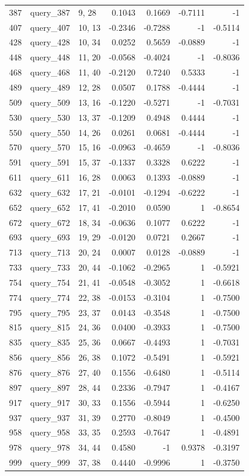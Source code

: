 {\begin{longtable}{@{}r l l r r r r@{}}
387 & query\_387 & 9, 28 & 0.1043 & 0.1669 & -0.7111 & -1 \\
407 & query\_407 & 10, 13 & -0.2346 & -0.7288 & -1 & -0.5114 \\
428 & query\_428 & 10, 34 & 0.0252 & 0.5659 & -0.0889 & -1 \\
448 & query\_448 & 11, 20 & -0.0568 & -0.4024 & -1 & -0.8036 \\
468 & query\_468 & 11, 40 & -0.2120 & 0.7240 & 0.5333 & -1 \\
489 & query\_489 & 12, 28 & 0.0507 & 0.1788 & -0.4444 & -1 \\
509 & query\_509 & 13, 16 & -0.1220 & -0.5271 & -1 & -0.7031 \\
530 & query\_530 & 13, 37 & -0.1209 & 0.4948 & 0.4444 & -1 \\
550 & query\_550 & 14, 26 & 0.0261 & 0.0681 & -0.4444 & -1 \\
570 & query\_570 & 15, 16 & -0.0963 & -0.4659 & -1 & -0.8036 \\
591 & query\_591 & 15, 37 & -0.1337 & 0.3328 & 0.6222 & -1 \\
611 & query\_611 & 16, 28 & 0.0063 & 0.1393 & -0.0889 & -1 \\
632 & query\_632 & 17, 21 & -0.0101 & -0.1294 & -0.6222 & -1 \\
652 & query\_652 & 17, 41 & -0.2010 & 0.0590 & 1 & -0.8654 \\
672 & query\_672 & 18, 34 & -0.0636 & 0.1077 & 0.6222 & -1 \\
693 & query\_693 & 19, 29 & -0.0120 & 0.0721 & 0.2667 & -1 \\
713 & query\_713 & 20, 24 & 0.0007 & 0.0128 & -0.0889 & -1 \\
733 & query\_733 & 20, 44 & -0.1062 & -0.2965 & 1 & -0.5921 \\
754 & query\_754 & 21, 41 & -0.0548 & -0.3052 & 1 & -0.6618 \\
774 & query\_774 & 22, 38 & -0.0153 & -0.3104 & 1 & -0.7500 \\
795 & query\_795 & 23, 37 & 0.0143 & -0.3548 & 1 & -0.7500 \\
815 & query\_815 & 24, 36 & 0.0400 & -0.3933 & 1 & -0.7500 \\
835 & query\_835 & 25, 36 & 0.0667 & -0.4493 & 1 & -0.7031 \\
856 & query\_856 & 26, 38 & 0.1072 & -0.5491 & 1 & -0.5921 \\
876 & query\_876 & 27, 40 & 0.1556 & -0.6480 & 1 & -0.5114 \\
897 & query\_897 & 28, 44 & 0.2336 & -0.7947 & 1 & -0.4167 \\
917 & query\_917 & 30, 33 & 0.1556 & -0.5944 & 1 & -0.6250 \\
937 & query\_937 & 31, 39 & 0.2770 & -0.8049 & 1 & -0.4500 \\
958 & query\_958 & 33, 35 & 0.2593 & -0.7647 & 1 & -0.4891 \\
978 & query\_978 & 34, 44 & 0.4580 & -1 & 0.9378 & -0.3197 \\
999 & query\_999 & 37, 38 & 0.4440 & -0.9996 & 1 & -0.3750 \\
\bottomrule
\end{longtable}
}
